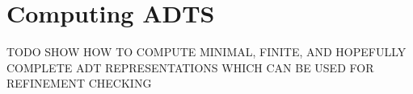 \section{Computing ADTS}
\label{sec:computing}

TODO SHOW HOW TO COMPUTE MINIMAL, FINITE, AND HOPEFULLY COMPLETE ADT
REPRESENTATIONS WHICH CAN BE USED FOR REFINEMENT CHECKING
